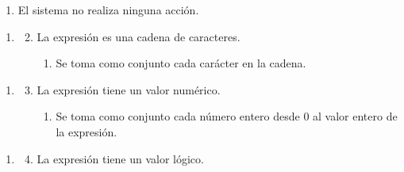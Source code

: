 \begin{framed}
\begin{description}
\begin{enumerate}
\begin {enumerate}
\begin{enumerate}
         \item El sistema no realiza ninguna acción.
         \end{enumerate}
      \end{enumerate}
   \end{enumerate}
   \begin{enumerate} \itemsep1pt \parskip0pt 
   \setcounter{enumi}{2}
   \renewcommand{\labelenumi}{}
   \renewcommand{\labelenumiii}{\arabic{enumiii}.}
   \renewcommand{\labelenumii}{\arabic{enumi}\alph{enumii}.}
      \item 
      \begin {enumerate}
         \setcounter{enumii}{1}
         \item La expresión es una cadena de caracteres.
         \begin{enumerate}
         \item Se toma como conjunto cada carácter en la cadena.
         \end{enumerate}
      \end{enumerate}
   \end{enumerate}
   \begin{enumerate} \itemsep1pt \parskip0pt 
   \setcounter{enumi}{2}
   \renewcommand{\labelenumi}{}
   \renewcommand{\labelenumiii}{\arabic{enumiii}.}
   \renewcommand{\labelenumii}{\arabic{enumi}\alph{enumii}.}
      \item 
      \begin {enumerate}
         \setcounter{enumii}{2}
         \item La expresión tiene un valor numérico.
         \begin{enumerate}
         \item Se toma como conjunto cada número entero desde 0 al valor entero
         de la expresión.
         \end{enumerate}
      \end{enumerate}
   \end{enumerate}
   \begin{enumerate} \itemsep1pt \parskip0pt 
   \setcounter{enumi}{2}
   \renewcommand{\labelenumi}{}
   \renewcommand{\labelenumiii}{\arabic{enumiii}.}
   \renewcommand{\labelenumii}{\arabic{enumi}\alph{enumii}.}
      \item 
      \begin {enumerate}
         \setcounter{enumii}{3}
         \item La expresión tiene un valor lógico.
         \begin{enumerate}

\end{enumerate}
\end{enumerate}
\end{enumerate}
\end{description}
\end{framed}
